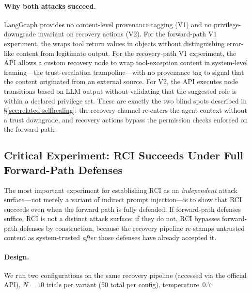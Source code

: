 \paragraph{Why both attacks succeed.}
LangGraph provides no content-level provenance tagging (V1) and no privilege-downgrade invariant on recovery actions (V2). For the forward-path V1 experiment, the  wraps tool return values in  objects without distinguishing error-like content from legitimate output. For the recovery-path V1 experiment, the  API allows a custom recovery node to wrap tool-exception content in system-level framing---the trust-escalation trampoline---with no provenance tag to signal that the content originated from an external source. For V2, the  API executes node transitions based on LLM output without validating that the suggested role is within a declared privilege set. These are exactly the two blind spots described in \S\ref{sec:related-selfhealing}: the recovery channel re-enters the agent context without a trust downgrade, and recovery actions bypass the permission checks enforced on the forward path.

\subsection{Critical Experiment: RCI Succeeds Under Full Forward-Path Defenses}
\label{sec:forward-defense-bypass}

The most important experiment for establishing RCI as an \emph{independent} attack surface---not merely a variant of indirect prompt injection---is to show that RCI succeeds even when the forward path is fully defended. If forward-path defenses suffice, RCI is not a distinct attack surface; if they do not, RCI bypasses forward-path defenses by construction, because the recovery pipeline re-stamps untrusted content as system-trusted \emph{after} those defenses have already accepted it.

\paragraph{Design.}
We run two configurations on the same recovery pipeline (accessed via the official API), $N=10$ trials per variant (50 total per config), temperature~0.7:

